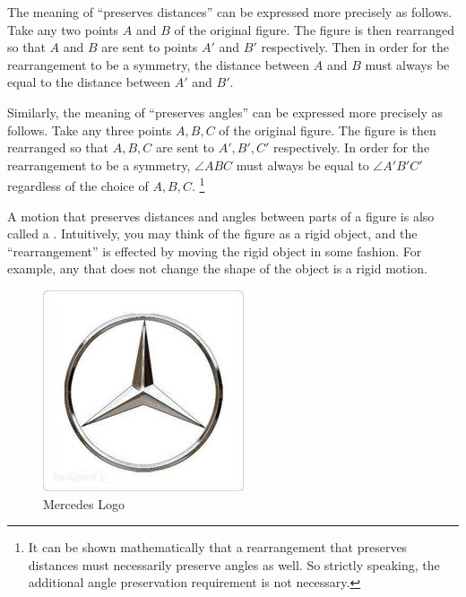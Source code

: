 \begin{rem}
The meaning  of ``preserves distances'' can be expressed more precisely as follows. Take any two points $A$ and $B$ of the original figure. The figure is then rearranged so that $A$ and $B$ are sent to points $A'$ and $B'$ respectively. Then in order for the rearrangement to be  a symmetry, the distance between $A$ and $B$ must always be equal to the distance between $A'$ and $B'$.

Similarly, the meaning of  ``preserves angles'' can be expressed more precisely as follows. Take any three points $A, B, C$ of the original figure. The figure is then rearranged so that $A, B, C$ are sent to $A', B', C'$ respectively. In order for the rearrangement to be  a symmetry, $\angle ABC$ must always be equal to $\angle A'B'C'$ regardless of the choice of $A, B, C$.
\footnote{It can be shown mathematically that a rearrangement that preserves distances must necessarily preserve angles as well. So strictly speaking, the additional  angle preservation  requirement is not necessary.}
\end{rem}

A motion that preserves distances and angles between parts of a figure is also called a . Intuitively, you may think of the figure as a rigid object, and the ``rearrangement'' is effected by moving the rigid object in some fashion.  For example, any   that does not change the shape of the object is a rigid motion.

\begin{figure}[ht]
\begin{center}
\includegraphics[scale=0.35]{images/mercedes.jpg}
\caption{Mercedes Logo}\label{mercedes}
\end{center}
\end{figure}

